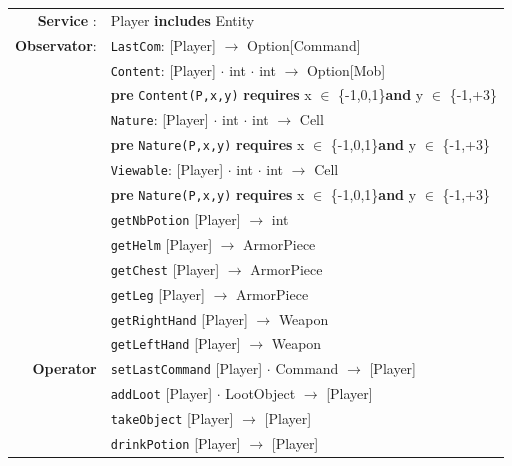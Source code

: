 \documentclass[12pt]{report}
\begin{document}
\begin{tabular}{rl}

\textbf{Service} : & Player \textbf{includes} Entity \\

\textbf{Observator}: & \texttt{LastCom}: \textrm{[Player]} $\rightarrow$ \textrm{Option[Command]} \\
& \texttt{Content}: \textrm{[Player]} $\cdot$ \textrm{int} $\cdot$ \textrm{int} $\rightarrow$ \textrm{Option[Mob]} \\
& \quad\quad\quad\quad\textbf{pre} \texttt{Content(P,x,y)} \textbf{requires} x $\in$ \{-1,0,1\}\textbf{and} y $\in$ \{-1,+3\}\\
& \texttt{Nature}: \textrm{[Player]} $\cdot$ \textrm{int} $\cdot$ \textrm{int} $\rightarrow$ \textrm{Cell} \\
& \quad\quad\quad\quad\textbf{pre} \texttt{Nature(P,x,y)} \textbf{requires} x $\in$ \{-1,0,1\}\textbf{and} y $\in$ \{-1,+3\}\\
& \texttt{Viewable}: \textrm{[Player]} $\cdot$ \textrm{int} $\cdot$ \textrm{int} $\rightarrow$ \textrm{Cell} \\
& \quad\quad\quad\quad\textbf{pre} \texttt{Nature(P,x,y)} \textbf{requires} x $\in$ \{-1,0,1\}\textbf{and} y $\in$ \{-1,+3\}\\

& \texttt{getNbPotion} \textrm{[Player]} $\rightarrow$ \textrm{int} \\
& \texttt{getHelm} \textrm{[Player]} $\rightarrow$ \textrm{ArmorPiece} \\
& \texttt{getChest} \textrm{[Player]} $\rightarrow$ \textrm{ArmorPiece} \\
& \texttt{getLeg} \textrm{[Player]} $\rightarrow$ \textrm{ArmorPiece} \\
& \texttt{getRightHand} \textrm{[Player]} $\rightarrow$ \textrm{Weapon} \\
& \texttt{getLeftHand} \textrm{[Player]} $\rightarrow$ \textrm{Weapon} \\

\textbf{Operator} & \texttt{setLastCommand} \textrm{[Player]} $\cdot$ \textrm{Command} $\rightarrow$ \textrm{[Player]} \\
&\texttt{addLoot} \textrm{[Player]} $\cdot$ \textrm{LootObject} $\rightarrow$ \textrm{[Player]} \\
&\texttt{takeObject} \textrm{[Player]} $\rightarrow$ \textrm{[Player]} \\
&\texttt{drinkPotion} \textrm{[Player]} $\rightarrow$ \textrm{[Player]} \\


\end{tabular}
\end{document}
